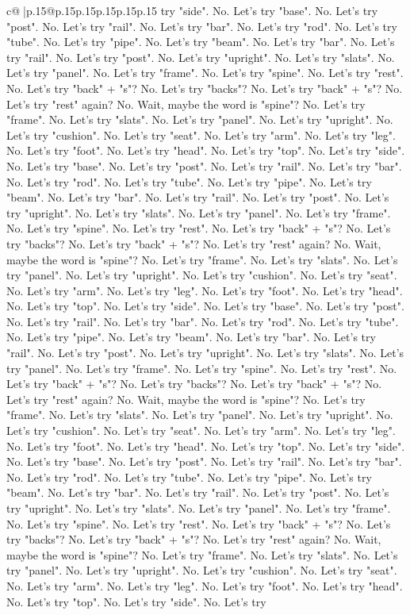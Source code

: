 \documentclass{article}
\begin{document}
{\begin{supertabular}{c@{$\;$}|p{.15\linewidth}@{}p{.15\linewidth}p{.15\linewidth}p{.15\linewidth}p{.15\linewidth}p{.15\linewidth}}
{{{try "side". No. Let's try "base". No. Let's try "post". No. Let's try "rail". No. Let's try "bar". No. Let's try "rod". No. Let's try "tube". No. Let's try "pipe". No. Let's try "beam". No. Let's try "bar". No. Let's try "rail". No. Let's try "post". No. Let's try "upright". No. Let's try "slats". No. Let's try "panel". No. Let's try "frame". No. Let's try "spine". No. Let's try "rest". No. Let's try "back" + "s"? No. Let's try "backs"? No. Let's try "back" + "s"? No. Let's try "rest" again? No. Wait, maybe the word is "spine"? No. Let's try "frame". No. Let's try "slats". No. Let's try "panel". No. Let's try "upright". No. Let's try "cushion". No. Let's try "seat". No. Let's try "arm". No. Let's try "leg". No. Let's try "foot". No. Let's try "head". No. Let's try "top". No. Let's try "side". No. Let's try "base". No. Let's try "post". No. Let's try "rail". No. Let's try "bar". No. Let's try "rod". No. Let's try "tube". No. Let's try "pipe". No. Let's try "beam". No. Let's try "bar". No. Let's try "rail". No. Let's try "post". No. Let's try "upright". No. Let's try "slats". No. Let's try "panel". No. Let's try "frame". No. Let's try "spine". No. Let's try "rest". No. Let's try "back" + "s"? No. Let's try "backs"? No. Let's try "back" + "s"? No. Let's try "rest" again? No. Wait, maybe the word is "spine"? No. Let's try "frame". No. Let's try "slats". No. Let's try "panel". No. Let's try "upright". No. Let's try "cushion". No. Let's try "seat". No. Let's try "arm". No. Let's try "leg". No. Let's try "foot". No. Let's try "head". No. Let's try "top". No. Let's try "side". No. Let's try "base". No. Let's try "post". No. Let's try "rail". No. Let's try "bar". No. Let's try "rod". No. Let's try "tube". No. Let's try "pipe". No. Let's try "beam". No. Let's try "bar". No. Let's try "rail". No. Let's try "post". No. Let's try "upright". No. Let's try "slats". No. Let's try "panel". No. Let's try "frame". No. Let's try "spine". No. Let's try "rest". No. Let's try "back" + "s"? No. Let's try "backs"? No. Let's try "back" + "s"? No. Let's try "rest" again? No. Wait, maybe the word is "spine"? No. Let's try "frame". No. Let's try "slats". No. Let's try "panel". No. Let's try "upright". No. Let's try "cushion". No. Let's try "seat". No. Let's try "arm". No. Let's try "leg". No. Let's try "foot". No. Let's try "head". No. Let's try "top". No. Let's try "side". No. Let's try "base". No. Let's try "post". No. Let's try "rail". No. Let's try "bar". No. Let's try "rod". No. Let's try "tube". No. Let's try "pipe". No. Let's try "beam". No. Let's try "bar". No. Let's try "rail". No. Let's try "post". No. Let's try "upright". No. Let's try "slats". No. Let's try "panel". No. Let's try "frame". No. Let's try "spine". No. Let's try "rest". No. Let's try "back" + "s"? No. Let's try "backs"? No. Let's try "back" + "s"? No. Let's try "rest" again? No. Wait, maybe the word is "spine"? No. Let's try "frame". No. Let's try "slats". No. Let's try "panel". No. Let's try "upright". No. Let's try "cushion". No. Let's try "seat". No. Let's try "arm". No. Let's try "leg". No. Let's try "foot". No. Let's try "head". No. Let's try "top". No. Let's try "side". No. Let's try }}}
\end{supertabular}}
\end{document}
